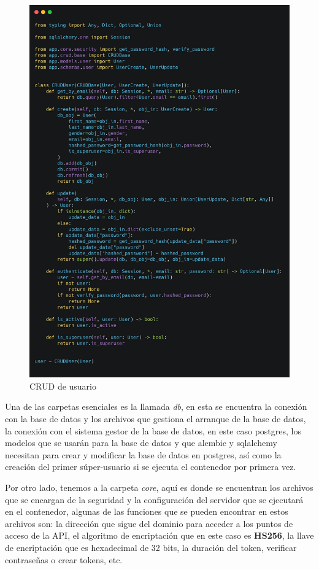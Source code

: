 \begin{figure}[!htb]
    \centering
    \includegraphics[scale=.10]{TT/img/implementacion/crud_user.png}
    \caption{CRUD de usuario}
    \label{graphic:user_crud}    
\end{figure}

Una de las carpetas esenciales es la llamada \textit{db}, en esta se encuentra la conexión con la base de datos y los archivos que gestiona el arranque de la base de datos, la conexión con el sistema gestor de la base de datos, en este caso postgres, los modelos que se usarán para la base de datos y que alembic y sqlalchemy necesitan para crear y modificar la base de datos en postgres, así como la creación del primer súper-usuario si se ejecuta el contenedor por primera vez.

Por otro lado, tenemos a la carpeta \textit{core}, aquí es donde se encuentran los archivos que se encargan de la seguridad y la configuración del servidor que se ejecutará en el contenedor, algunas de las funciones que se pueden encontrar en estos archivos son: la dirección que sigue del dominio para acceder a los puntos de acceso de la API, el algoritmo de encriptación que en este caso es \textbf{HS256}, la llave de encriptación que es hexadecimal de 32 bits, la duración del token, verificar contraseñas o crear tokens, etc.

